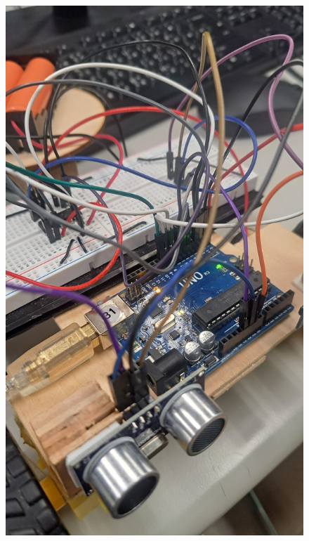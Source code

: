 \documentclass[a4paper,12pt]{./article}
\begin{document}
\begin{center}\begin{figure}[H]\centering
\hfill
\begin{minipage}[t]{./0.45\textwidth}
\centering
\includegraphics[width=\textwidth]{./photos/e.jpg}
\end{minipage}
\hfill
\begin{minipage}[t]{./0.45\textwidth}
\centering

\end{minipage}
\end{figure}
\end{center}
\end{document}
